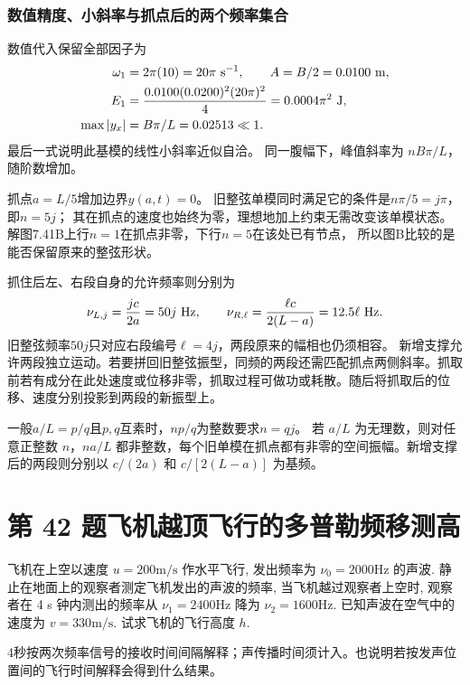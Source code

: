 \documentclass[UTF8,fontset=fandol,a4paper,11pt]{ctexart}
\newcommand{\tagline}[1]{\noindent{\small\color{muted}#1}\par}
\begin{document}
\subsubsection*{数值精度、小斜率与抓点后的两个频率集合}
数值代入保留全部因子为
\[
\begin{aligned}
\omega_1&=2\pi(10)=20\pi\ {\rm s^{-1}},\qquad
A=B/2=0.0100\ {\rm m},\\
E_1&=\frac{0.0100(0.0200)^2(20\pi)^2}{4}
=0.0004\pi^2\ {\rm J},\\
\max|y_x|&=B\pi/L=0.02513\ll1.
\end{aligned}
\]
最后一式说明此基模的线性小斜率近似自洽。
同一腹幅下，峰值斜率为 $nB\pi/L$，随阶数增加。

抓点$a=L/5$增加边界$y(a,t)=0$。
旧整弦单模同时满足它的条件是$n\pi/5=j\pi$，即$n=5j$；
其在抓点的速度也始终为零，理想地加上约束无需改变该单模状态。
解图7.41B上行$n=1$在抓点非零，下行$n=5$在该处已有节点，
所以图B比较的是能否保留原来的整弦形状。

抓住后左、右段自身的允许频率则分别为
\[
\nu_{L,j}=\frac{jc}{2a}=50j\ {\rm Hz},\qquad
\nu_{R,\ell}=\frac{\ell c}{2(L-a)}=12.5\ell\ {\rm Hz}.
\]
旧整弦频率$50j$只对应右段编号$\ell=4j$，两段原来的幅相也仍须相容。
新增支撑允许两段独立运动。若要拼回旧整弦振型，同频的两段还需匹配抓点两侧斜率。抓取前若有成分在此处速度或位移非零，抓取过程可做功或耗散。随后将抓取后的位移、速度分别投影到两段的新振型上。

一般$a/L=p/q$且$p,q$互素时，$np/q$为整数要求$n=qj$。
若 $a/L$ 为无理数，则对任意正整数 $n$，$na/L$ 都非整数，每个旧单模在抓点都有非零的空间振幅。新增支撑后的两段则分别以 $c/(2a)$ 和 $c/[2(L-a)]$ 为基频。




\section*{第 42 题\quad 飞机越顶飞行的多普勒频移测高}

\tagline{M-07-42}

飞机在上空以速度 \(u=200 \mathrm{m} / \mathrm{s}\) 作水平飞行,
发出频率为 \(\nu_{0}=2000 \mathrm{Hz}\) 的声波.
静止在地面上的观察者测定飞机发出的声波的频率, 当飞机越过观察者上空时,
观察者在 4 s 钟内测出的频率从 \(\nu_{1}=2400 \mathrm{Hz}\) 降为
\(\nu_{2}=1600 \mathrm{Hz}\). 已知声波在空气中的速度为
\(v=330 \mathrm{m} / \mathrm{s}\). 试求飞机的飞行高度 \(h\).

4秒按两次频率信号的接收时间间隔解释；声传播时间须计入。也说明若按发声位置间的飞行时间解释会得到什么结果。
\end{document}
